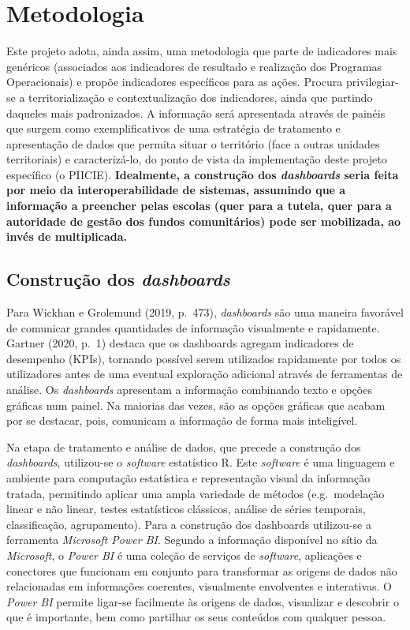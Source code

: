 \documentclass[
]{book}
\begin{document}
\hypertarget{metodologia}{%
\section{Metodologia}\label{metodologia}}

Este projeto adota, ainda assim, uma metodologia que parte de indicadores mais genéricos (associados aos indicadores de resultado e realização dos Programas Operacionais) e propõe indicadores específicos para as ações. Procura privilegiar-se a territorialização e contextualização dos indicadores, ainda que partindo daqueles mais padronizados. A informação será apresentada através de painéis que surgem como exemplificativos de uma estratégia de tratamento e apresentação de dados que permita situar o território (face a outras unidades territoriais) e caracterizá-lo, do ponto de vista da implementação deste projeto específico (o PIICIE). \textbf{Idealmente, a construção dos \emph{dashboards} seria feita por meio da interoperabilidade de sistemas, assumindo que a informação a preencher pelas escolas (quer para a tutela, quer para a autoridade de gestão dos fundos comunitários) pode ser mobilizada, ao invés de multiplicada.}

\hypertarget{construuxe7uxe3o-dos-dashboards}{%
\subsection{\texorpdfstring{Construção dos \emph{dashboards}}{Construção dos dashboards}}\label{construuxe7uxe3o-dos-dashboards}}

Para Wickhan e Grolemund (2019, p.~473), \emph{dashboards} são uma maneira favorável de comunicar grandes quantidades de informação visualmente e rapidamente. Gartner (2020, p.~1) destaca que os dashboards agregam indicadores de desempenho (KPIs), tornando possível serem utilizados rapidamente por todos os utilizadores antes de uma eventual exploração adicional através de ferramentas de análise. Os \emph{dashboards} apresentam a informação combinando texto e opções gráficas num painel. Na maiorias das vezes, são as opções gráficas que acabam por se destacar, pois, comunicam a informação de forma mais inteligível.

Na etapa de tratamento e análise de dados, que precede a construção dos \emph{dashboards}, utilizou-se o \emph{software} estatístico R. Este \emph{software} é uma linguagem e ambiente para computação estatística e representação visual da informação tratada, permitindo aplicar uma ampla variedade de métodos (e.g.~modelação linear e não linear, testes estatísticos clássicos, análise de séries temporais, classificação, agrupamento). Para a construção dos dashboards utilizou-se a ferramenta \emph{Microsoft Power BI}. Segundo a informação disponível no sítio da \emph{Microsoft}, o \emph{Power BI} é uma coleção de serviços de \emph{software}, aplicações e conectores que funcionam em conjunto para transformar as origens de dados não relacionadas em informações coerentes, visualmente envolventes e interativas. O \emph{Power BI} permite ligar-se facilmente às origens de dados, visualizar e descobrir o que é importante, bem como partilhar os seus conteúdos com qualquer pessoa.
\end{document}
